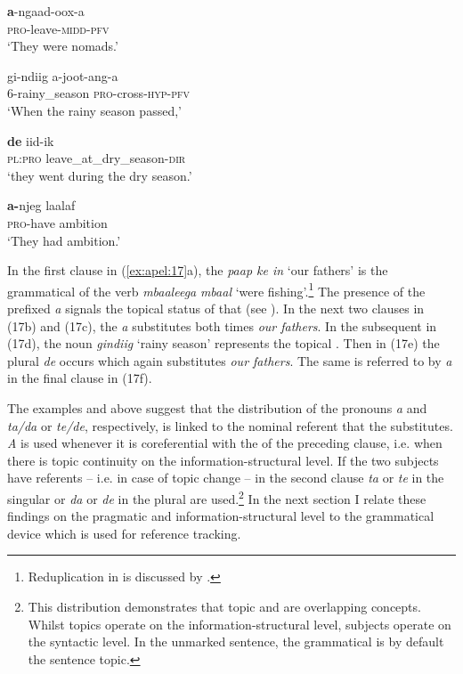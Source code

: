 \documentclass[output=paper
,newtxmath
,modfonts
,nonflat]{langsci/langscibook}
\begin{document}
\ex
\gll \textbf{a}-ngaad-oox-a         \\
     \textsc{pro-}leave-\textsc{midd-pfv} \\
\glt ‘They were nomads.’   
 
\ex
\gll gi-ndiig a-joot-ang-a  \\
     \textsc{6-}rainy\_season \textsc{pro-}cross\textsc{-hyp-pfv}    \\
\glt ‘When the rainy season passed,’
 

\ex
\gll \textbf{de} iid-ik  \\
     \textsc{pl:pro} leave\_at\_dry\_season-\textsc{dir}\\
\glt ‘they went during the dry season.’
 

\ex
\gll \textbf{a-}njeg laalaf\\
     \textsc{pro-}have ambition\\
\glt ‘They had ambition.’
\z
\z

In the first clause in (\ref{ex:apel:17}a), the  \textit{paap ke in} ‘our fathers’ is the grammatical  of the verb \textit{mbaaleega} \textit{mbaal} ‘were fishing’.\footnote{Reduplication in  is discussed by \citet{Heath2014}.} The presence of the prefixed  \textit{a} signals the topical status of that  (see ). In the next two clauses in (17b) and (17c), the  \textit{a} substitutes both times \textit{our fathers}. In the subsequent  in (17d), the noun \textit{gindiig} ‘rainy season’ represents the topical . Then in (17e) the plural  \textit{de} occurs which again substitutes \textit{our fathers}. The same  is referred to by \textit{a} in the final clause in (17f).

The examples  and  above suggest that the distribution of the  pronouns \textit{a} and \textit{ta/da} or \textit{te/de}, respectively, is linked to the nominal referent that the  substitutes. \textit{A} is used whenever it is coreferential with the  of the preceding clause, i.e. when there is topic continuity on the information-structural level. If the two subjects have  referents -- i.e. in case of topic change -- in the second clause \textit{ta} or \textit{te} in the singular or \textit{da} or \textit{de} in the plural are used.\footnote{This distribution demonstrates that topic and  are overlapping concepts. Whilst topics operate on the information-structural level, subjects operate on the syntactic level. In the unmarked sentence, the grammatical  is by default the sentence topic.} In the next section I relate these findings on the pragmatic and information-structural level to the grammatical device  which is used for reference tracking.
\end{document}
